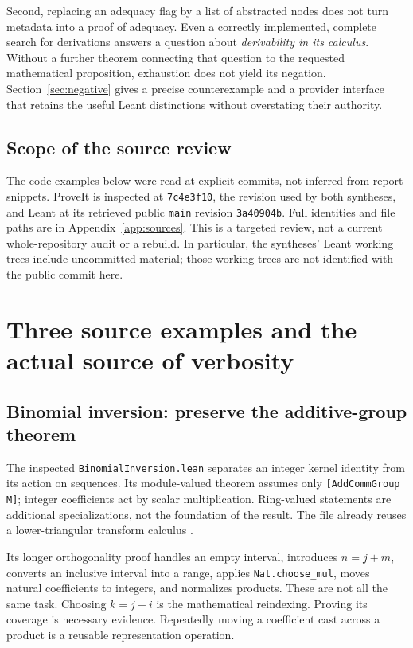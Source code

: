 \documentclass[11pt,letterpaper]{article}
\newcommand{\code}[1]{\nolinkurl{#1}}
\numberwithin{equation}{section}
\begin{document}
Second, replacing an adequacy flag by a list of abstracted nodes does not turn
metadata into a proof of adequacy. Even a correctly implemented, complete search
for derivations answers a question about \emph{derivability in its calculus}.
Without a further theorem connecting that question to the requested mathematical
proposition, exhaustion does not yield its negation. Section~\ref{sec:negative}
gives a precise counterexample and a provider interface that retains the useful
Leant distinctions without overstating their authority.

\subsection{Scope of the source review}
The code examples below were read at explicit commits, not inferred from report
snippets. ProveIt is inspected at \code{7c4e3f10}, the revision used by both
syntheses, and Leant at its retrieved public \code{main} revision
\code{3a40904b}. Full identities and file paths are in Appendix~\ref{app:sources}.
This is a targeted review, not a current whole-repository audit or a rebuild.
In particular, the syntheses' Leant working trees include uncommitted material;
those working trees are not identified with the public commit here.

\section{Three source examples and the actual source of verbosity}\label{sec:source}
\subsection{Binomial inversion: preserve the additive-group theorem}
The inspected \code{BinomialInversion.lean} separates an integer kernel identity
from its action on sequences. Its module-valued theorem assumes only
\code{[AddCommGroup M]}; integer coefficients act by scalar multiplication.
Ring-valued statements are additional specializations, not the foundation of the
result. The file already reuses a lower-triangular transform calculus
\cite{p-binomial}.

Its longer orthogonality proof handles an empty interval, introduces
$n=j+m$, converts an inclusive interval into a range, applies
\code{Nat.choose_mul}, moves natural coefficients to integers, and normalizes
products. These are not all the same task. Choosing $k=j+i$ is the mathematical
reindexing. Proving its coverage is necessary evidence. Repeatedly moving a
coefficient cast across a product is a reusable representation operation.
\end{document}
